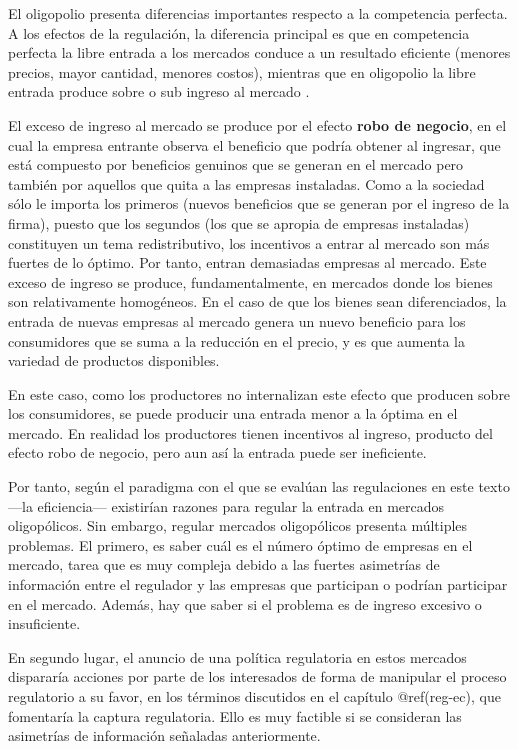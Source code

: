 \documentclass[
  12pt,
  spanish,
]{book}
\begin{document}
El oligopolio presenta diferencias importantes respecto a la competencia
perfecta. A los efectos de la regulación, la diferencia principal es que
en competencia perfecta la libre entrada a los mercados conduce a un
resultado eficiente (menores precios, mayor cantidad, menores costos),
mientras que en oligopolio la libre entrada produce sobre o sub ingreso
al mercado \citep{Mankiw1986}.

El exceso de ingreso al mercado se produce por el efecto \textbf{robo de
negocio}, en el cual la empresa entrante observa el beneficio que podría
obtener al ingresar, que está compuesto por beneficios genuinos que se
generan en el mercado pero también por aquellos que quita a las empresas
instaladas. Como a la sociedad sólo le importa los primeros (nuevos
beneficios que se generan por el ingreso de la firma), puesto que los
segundos (los que se apropia de empresas instaladas) constituyen un tema
redistributivo, los incentivos a entrar al mercado son más fuertes de lo
óptimo. Por tanto, entran demasiadas empresas al mercado. Este exceso de
ingreso se produce, fundamentalmente, en mercados donde los bienes son
relativamente homogéneos. En el caso de que los bienes sean
diferenciados, la entrada de nuevas empresas al mercado genera un nuevo
beneficio para los consumidores que se suma a la reducción en el precio,
y es que aumenta la variedad de productos disponibles.

En este caso, como los productores no internalizan este efecto que
producen sobre los consumidores, se puede producir una entrada menor a
la óptima en el mercado. En realidad los productores tienen incentivos
al ingreso, producto del efecto robo de negocio, pero aun así la entrada
puede ser ineficiente.

Por tanto, según el paradigma con el que se evalúan las regulaciones en
este texto ---la eficiencia--- existirían razones para regular la
entrada en mercados oligopólicos. Sin embargo, regular mercados
oligopólicos presenta múltiples problemas. El primero, es saber cuál es
el número óptimo de empresas en el mercado, tarea que es muy compleja
debido a las fuertes asimetrías de información entre el regulador y las
empresas que participan o podrían participar en el mercado. Además, hay
que saber si el problema es de ingreso excesivo o insuficiente.

En segundo lugar, el anuncio de una política regulatoria en estos
mercados dispararía acciones por parte de los interesados de forma de
manipular el proceso regulatorio a su favor, en los términos discutidos
en el capítulo @ref(reg-ec), que fomentaría la captura regulatoria. Ello
es muy factible si se consideran las asimetrías de información señaladas
anteriormente.
\end{document}
